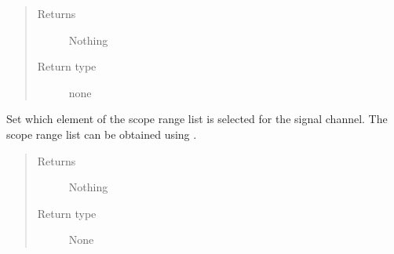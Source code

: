 \documentclass[letterpaper,10pt,english]{sphinxmanual}
\begin{document}
\begin{fulllineitems}
\begin{fulllineitems}
\begin{quote}
\begin{description}
\item[{Returns}] \leavevmode
\sphinxAtStartPar
Nothing

\item[{Return type}] \leavevmode
\sphinxAtStartPar
none

\end{description}\end{quote}

\end{fulllineitems}


\begin{fulllineitems}
\label{\detokenize{index:TiePieLCR_settings.TiePieLCR_settings.set_signal_scope_range}}
\sphinxAtStartPar
Set which element of the scope range list is selected for the signal channel. The scope range list can be obtained using {\hyperref[\detokenize{index:TiePieLCR_settings.TiePieLCR_settings.get_scope_range_list}]{}}.
\begin{quote}\begin{description}
\item[{Returns}] \leavevmode
\sphinxAtStartPar
Nothing

\item[{Return type}] \leavevmode
\sphinxAtStartPar
None

\end{description}\end{quote}

\end{fulllineitems}



\end{fulllineitems}
\end{document}
